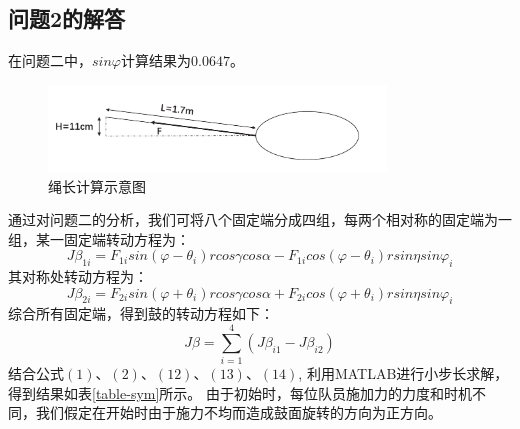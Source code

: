 \documentclass{cumcm}
\begin{document}
\subsection{问题2的解答}
在问题二中，$sin\varphi$计算结果为$0.0647$。
\begin{figure}[H]
\centering
\includegraphics[width=0.8\textwidth]{img/string1.pdf}
\caption{绳长计算示意图}
\end{figure}
通过对问题二的分析，我们可将八个固定端分成四组，每两个相对称的固定端为一组，某一固定端转动方程为：
\begin{equation}
J\beta_{1i}= F_{1i}sin(\varphi-\theta_i)rcos\gamma cos\alpha- F_{1i}cos(\varphi-\theta_i)rsin\eta sin\varphi_i
\end{equation}
其对称处转动方程为：
\begin{equation}
J \beta_{2i}= F_{2i}sin(\varphi+\theta_i)rcos\gamma cos\alpha+F_{2i}cos(\varphi+\theta_i)rsin\eta sin\varphi_i
\end{equation}
综合所有固定端，得到鼓的转动方程如下：
\begin{equation}
J \beta=\sum_{i=1}^4 (J\beta_{i1}-J\beta_{i2})
\end{equation}
\quad \quad
结合公式$(1)$、$(2)$、$(12)$、$(13)$、$(14)$, 利用MATLAB进行小步长求解，得到结果如表\ref{table-sym}所示。
由于初始时，每位队员施加力的力度和时机不同，我们假定在开始时由于施力不均而造成鼓面旋转的方向为正方向。
\end{document}
